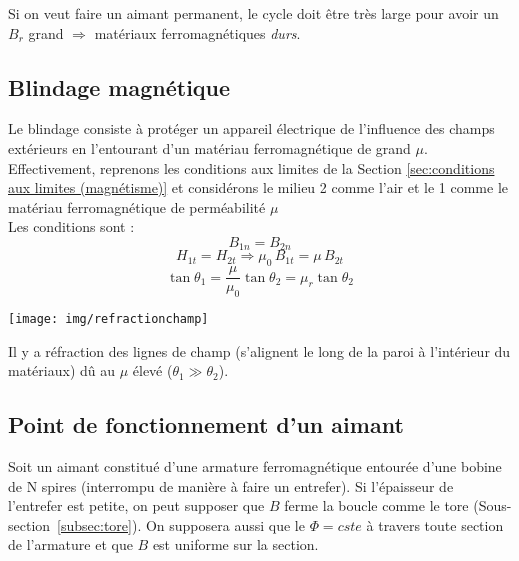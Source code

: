 \documentclass	[11pt, a4paper, openany]{book}
\begin{document}
Si on veut faire un aimant permanent, le cycle doit être très large pour avoir un $B_r$ grand $\Rightarrow$ matériaux ferromagnétiques \textit{durs}. 
\subsection{Blindage magnétique}
Le blindage consiste à protéger un appareil électrique de l'influence des champs extérieurs en l'entourant d'un matériau ferromagnétique de grand $\mu$.\\

Effectivement, reprenons les conditions aux limites de la Section \ref{sec:conditions aux limites (magnétisme)} et considérons le milieu 2 comme l'air et le 1 comme le matériau ferromagnétique de perméabilité $\mu$\\
Les conditions sont :$$
B_{1n} =B_{2n}$$\begin{equation}
H_{1t} =H_{2t}\Rightarrow \mu_0\,B_{1t}=\mu\,B_{2t}\end{equation}$$
\tan\theta_1 =\frac{\mu}{\mu_0}\tan\theta_2=\mu_r\tan\theta_2$$
\begin{center}
\texttt{[image: img/refractionchamp]}
\end{center}
Il y a réfraction des lignes de champ (s'alignent le long de la paroi à l'intérieur du matériaux) dû au $\mu$ élevé ($\theta_1\gg\theta_2$).
\subsection{Point de fonctionnement d'un aimant}
Soit un aimant constitué d'une armature ferromagnétique entourée d'une bobine de N spires (interrompu de manière à faire un entrefer). Si l'épaisseur de l'entrefer est petite, on peut supposer que $B$ ferme la boucle comme le tore (Sous-section~\ref{subsec:tore}). On supposera aussi que le $\Phi=cste$ à travers toute section de l'armature et que $B$ est uniforme sur la section.\\
\end{document}
